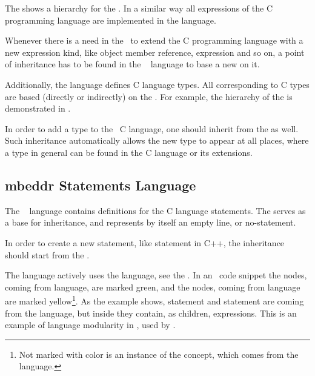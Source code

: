 The  shows a hierarchy for the  . In a similar way all expressions of the 
C programming language are implemented in the  language.

Whenever there is a need in the \cpppl\ to extend the C programming language with a new expression kind, like 
object member reference,  expression and so on, a point of inheritance has to be found in the 
\mbdr\  language to base a new  on it.



Additionally, the  language defines  C language types. 
All  corresponding to C types are based (directly or indirectly) on the  .
For example, the hierarchy of the   is demonstrated in . 

In order to add a type to the \mbdr\ C language, one should inherit from the   as well.
Such inheritance automatically allows the new type to appear at all places, where a type in general can be found
in the C language or its extensions.


\subsection{mbeddr Statements Language}

The \mbdr\  language contains definitions for the C language statements. The   serves as a
base for inheritance, and represents by itself an empty line, or no-statement.

In order to create a new statement, like  statement in C++, the inheritance should start from the  .


The  language actively uses the  language, see the . In an \mbdr\ code snippet
the nodes, coming from  language, are marked green, and the nodes, coming from  language are
marked yellow\footnote{Not marked with color is an instance of the  concept, which comes from the  language.}. As the example shows, 
 statement and  statement are coming from the  language,
but inside they contain, as children, expressions. This is an example of language modularity in \jbmps, used by \mbdr.

